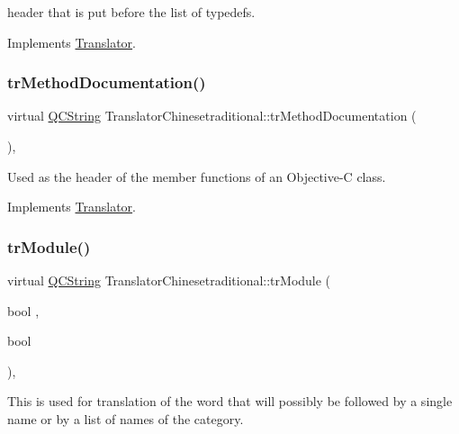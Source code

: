 header that is put before the list of typedefs. 

Implements \mbox{\hyperlink{class_translator}{Translator}}.

\mbox{\label{class_translator_chinesetraditional_a9fd0d0249670ff6273e43449ef315c49}} 
\subsubsection{\texorpdfstring{trMethodDocumentation()}{trMethodDocumentation()}}
{\footnotesize\ttfamily virtual \mbox{\hyperlink{class_q_c_string}{Q\+C\+String}} Translator\+Chinesetraditional\+::tr\+Method\+Documentation (\begin{DoxyParamCaption}{ }\end{DoxyParamCaption})\hspace{0.3cm}{\ttfamily [inline]}, {\ttfamily [virtual]}}

Used as the header of the member functions of an Objective-\/C class. 

Implements \mbox{\hyperlink{class_translator}{Translator}}.

\mbox{\label{class_translator_chinesetraditional_a351a730e1e5f987c48e35459f7423d18}} 
\subsubsection{\texorpdfstring{trModule()}{trModule()}}
{\footnotesize\ttfamily virtual \mbox{\hyperlink{class_q_c_string}{Q\+C\+String}} Translator\+Chinesetraditional\+::tr\+Module (\begin{DoxyParamCaption}\item[{bool}]{,  }\item[{bool}]{ }\end{DoxyParamCaption})\hspace{0.3cm}{\ttfamily [inline]}, {\ttfamily [virtual]}}

This is used for translation of the word that will possibly be followed by a single name or by a list of names of the category. 


